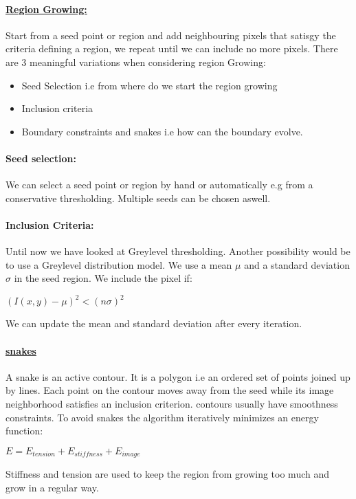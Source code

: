 \documentclass[8pt]{extreport}
\begin{document}
\paragraph{\underline{Region Growing:}} Start from a seed point or region and add neighbouring pixels that satisgy the criteria defining a region, we repeat until we can include no more pixels. 
There are 3 meaningful variations when considering region Growing:
\begin{itemize}
\item Seed Selection i.e from where do we start the region growing
\item Inclusion criteria 
\item Boundary constraints and snakes i.e how can the boundary evolve.
\end{itemize}

\paragraph{Seed selection:} We can select a seed point or region by hand or automatically e.g from a conservative thresholding. Multiple seeds can be chosen aswell. 

\paragraph{Inclusion Criteria:} Until now we have looked at Greylevel thresholding. Another possibility would be to use a Greylevel distribution model. We use a mean $\mu$ and a standard deviation $\sigma$ in the seed region. We include the pixel if:
\begin{center}
$(I(x,y) - \mu)^2 < (n\sigma)^2$ 
\end{center}
We can update the mean and standard deviation after every iteration.

\paragraph{\underline{snakes}} A snake is an active contour. It is a polygon i.e an ordered set of points joined up by lines. Each point on the contour moves away from the seed while its image neighborhood satisfies an inclusion criterion. contours usually have smoothness constraints. To avoid snakes the algorithm iteratively minimizes an energy function:
\begin{center}
$E = E_{tension} + E_{stiffness} + E_{image}$
\end{center}
Stiffness and tension are used to keep the region from growing too much and grow in a regular way.
\end{document}
